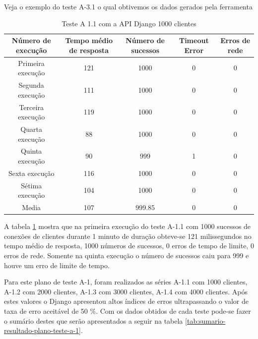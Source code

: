   Veja o exemplo do teste A-3.1 o qual obtivemos os dados gerados pela ferramenta
  
  \begin{table}[H]
    \centering
    \footnotesize
    \setlength{\abovecaptionskip}{0pt}
    \setlength{\belowcaptionskip}{0pt}
    \caption[Teste A-1.1 com a API Django 1000 clientes]{Teste A 1.1 com a API Django 1000 clientes}
    \label{tab:teste-a-1-1}
    \begin{tabular}{c|c|c|c|c}
      \hline \hline
      Número de execução &	Tempo médio de resposta &	Número de sucessos &	Timeout Error &		 Erros de rede \\
      \hline \hline
      Primeira execução &		121 &				1000 &			0 &			0 \\
      Segunda execução &		111 &				1000 &			0 &			0 \\
      Terceira execução &		119 &				1000 &			0 &			0 \\
      Quarta execução  &		88 &				1000 &			0 &			0 \\
      Quinta execução  &		90 &				999 &			1 &			0 \\
      Sexta execução   &		116 &				1000 &			0 &			0 \\
      Sétima execução  &		104 &				1000 &			0 &			0 \\
      Media & 				107 &				999.85 & 		0 &			0 \\
      \hline \hline
    \end{tabular}
  \end{table}  
  
  A tabela \ref{tab:teste-a-1-1} mostra que na primeira execução do teste A-1.1 com 1000 sucessos de conexões de clientes
  durante 1 minuto de duração obteve-se 121 milissegundos no tempo médio de resposta,
  1000 números de sucessos, 0 erros de tempo de limite, 0 erros de rede. Somente na quinta execução o número de sucessos
  caiu para 999 e houve um erro de limite de tempo.
  
  Para este plano de teste A-1, foram realizados as séries A-1.1 com 1000 clientes, A-1.2 com 2000 clientes, A-1.3 com 3000 clientes,
  A-1.4 com 4000 clientes. Após estes valores o Django apresentou altos índices de erros ultrapassando o valor de taxa de erro
  aceitável de 50 \%. Com os dados obtidos de cada teste pode-se fazer o sumário
  destes que serão apresentados a seguir na tabela \ref{tab:sumario-resultado-plano-teste-a-1}.
  
